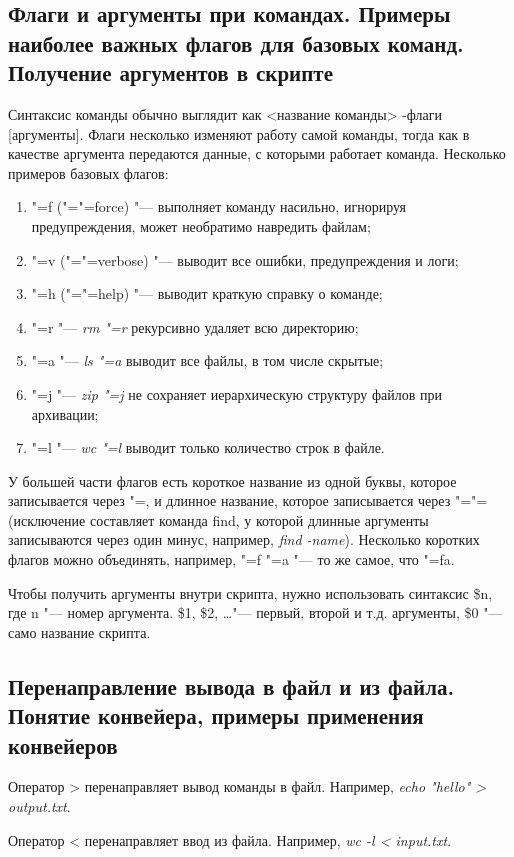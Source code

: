 \documentclass[12pt]{article}
\begin{document}
\subsection{Флаги и аргументы при командах. Примеры наиболее важных флагов для базовых команд. Получение аргументов в скрипте}
Синтаксис команды обычно выглядит как <название команды> -флаги [аргументы]. Флаги несколько изменяют работу самой команды, тогда как в качестве аргумента передаются данные, с которыми работает команда. Несколько примеров базовых флагов:
\begin{enumerate}
\item "=f ("="=force) "--- выполняет команду насильно, игнорируя предупреждения, может необратимо навредить файлам;
\item "=v ("="=verbose) "--- выводит все ошибки, предупреждения и логи;
\item "=h ("="=help) "--- выводит краткую справку о команде;
\item "=r "--- \textit{rm "=r} рекурсивно удаляет всю директорию;
\item "=a "--- \textit{ls "=a} выводит все файлы, в том числе скрытые;
\item "=j "--- \textit{zip "=j} не сохраняет иерархическую структуру файлов при архивации;
\item "=l "--- \textit{wc "=l} выводит только количество строк в файле.
\end{enumerate}

У большей части флагов есть короткое название из одной буквы, которое записывается через "=, и длинное название, которое записывается через "="= (исключение составляет команда find, у которой длинные аргументы записываются через один минус, например, \textit{find -name}). Несколько коротких флагов можно объединять, например, "=f "=a "--- то же самое, что "=fa.

Чтобы получить аргументы внутри скрипта, нужно использовать синтаксис \$n, где n "--- номер аргумента. \$1, \$2, \dots "--- первый, второй и т.д. аргументы, \$0 "--- само название скрипта.

\subsection{Перенаправление вывода в файл и из файла. Понятие конвейера, примеры применения конвейеров}
Оператор > перенаправляет вывод команды в файл. Например, \textit{echo "hello" > output.txt}.

Оператор < перенаправляет ввод из файла. Например, \textit{wc -l < input.txt}.
\end{document}
